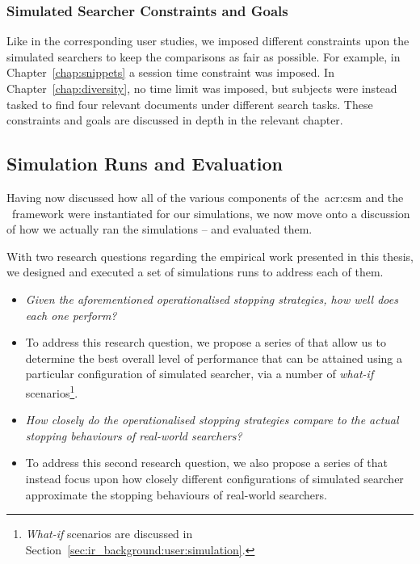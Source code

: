 \subsubsection{Simulated Searcher Constraints and Goals}\label{sec:method:simulation:grounding:constraints}
Like in the corresponding user studies, we imposed different constraints upon the simulated searchers to keep the comparisons as fair as possible. For example, in Chapter~\ref{chap:snippets} a session time constraint was imposed. In Chapter~\ref{chap:diversity}, no time limit was imposed, but subjects were instead tasked to find four relevant documents under different search tasks. These constraints and goals are discussed in depth in the relevant chapter.

\subsection{Simulation Runs and Evaluation}\label{sec:method:simulation:runs}
Having now discussed how all of the various components of the~\gls{acr:csm} and the \simiir~framework were instantiated for our simulations, we now move onto a discussion of how we actually ran the simulations -- and evaluated them.

With two research questions regarding the empirical work presented in this thesis, we designed and executed a set of simulations runs to address each of them.

\begin{itemize}
    \item{ \emph{Given the aforementioned operationalised stopping strategies, how well does each one perform?}}
    \item[]{To address this research question, we propose a series of  that allow us to determine the best overall level of performance that can be attained using a particular configuration of simulated searcher, via a number of \emph{what-if} scenarios\footnote{\emph{What-if} scenarios are discussed in Section~\ref{sec:ir_background:user:simulation}.}.}
    
    \item{ \emph{How closely do the operationalised stopping strategies compare to the actual stopping behaviours of real-world searchers?}}
    \item[]{To address this second research question, we also propose a series of  that instead focus upon how closely different configurations of simulated searcher approximate the stopping behaviours of real-world searchers.}
\end{itemize}

